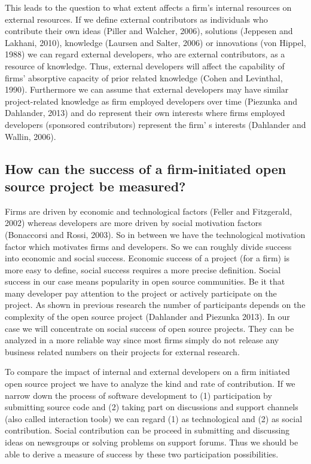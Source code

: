 This leads to the question to what extent affects a firm's internal resources on external resources. If we define external contributors as individuals who contribute their own ideas (Piller and Walcher, 2006), solutions (Jeppesen and Lakhani, 2010), knowledge (Laursen and Salter, 2006) or innovations (von Hippel, 1988) we can regard external developers, who are external contributors, as a resource of knowledge. Thus, external developers will affect the capability of firms’ absorptive capacity of prior related knowledge (Cohen and Levinthal, 1990). Furthermore we can assume that external developers may have similar project-related knowledge as firm employed developers over time (Piezunka and Dahlander, 2013) and do represent their own interests where firms employed developers (sponsored contributors) represent the firm’ s interests (Dahlander and Wallin, 2006).

\subsection{How can the success of a firm-initiated open source project be measured?}

Firms are driven by economic and technological factors (Feller and Fitzgerald, 2002) whereas developers are more driven by social motivation factors (Bonaccorsi and Rossi, 2003). So in between we have the technological motivation factor which motivates firms and developers. So we can roughly divide success into economic and social success. Economic success of a project (for a firm) is more easy to define, social success requires a more precise definition. Social success in our case means popularity in open source communities. Be it that many developer pay attention to the project or actively participate on the project. As shown in previous research the number of participants depends on the complexity of the open source project (Dahlander and Piezunka 2013). In our case we will concentrate on social success of open source projects. They can be analyzed in a more reliable way since most firms simply do not release any business related numbers on their projects for external research.

To compare the impact of internal and external developers on a firm initiated open source project we have to analyze the kind and rate of contribution. If we narrow down the process of software development to (1) participation by submitting source code and (2) taking part on discussions and support channels (also called interaction tools) we can regard (1) as technological and (2) as social contribution. Social contribution can be proceed in submitting and discussing ideas on newsgroups or solving problems on support forums. Thus we should be able to derive a measure of success by these two participation possibilities.

